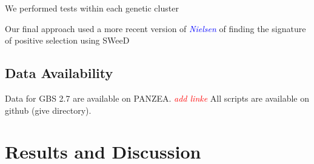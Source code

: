 \documentclass[9pt,twocolumn,twoside]{gsajnl}
\newcommand{\jri}[1]{\textcolor{red}{ \emph{ #1}} }
\newcommand{\kc}[1]{\textcolor{blue}{ \emph{ #1}} }
\begin{document}
We performed tests within each genetic cluster

Our final approach used a more recent version of \kc{Nielsen} of finding the signature of positive selection using SWeeD

\subsection*{Data Availability}

Data for GBS 2.7 are available on PANZEA.\jri{add linke} All scripts are available on github (give directory).




\section*{Results and Discussion}
\end{document}
